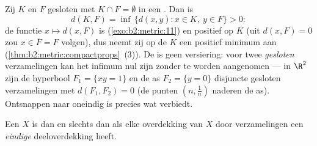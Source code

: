 \begin{example}\label{ex:b2:metric:setdistance}
Zij $K$  en $F$ gesloten met $K \cap F = \emptyset$ in een
. Dan is
\[
d(K, F) = \inf\,\{d(x, y) : x \in K,\ y \in F\} > 0 :
\]
de functie $x \mapsto d(x, F)$ is 
(\cref{exo:b2:metric:11}) en positief op $K$ (uit $d(x, F) = 0$
zou $x \in \overline F = F$ volgen), dus neemt zij op de 
$K$ een positief minimum aan
(\cref{thm:b2:metric:compactprops}~(3)). De  is geen
versiering: voor twee \emph{gesloten} verzamelingen kan het
infimum nul zijn zonder te worden aangenomen --- in $\R^2$ zijn de
hyperbool $F_1 = \{xy = 1\}$ en de as $F_2 = \{y = 0\}$ disjuncte
gesloten verzamelingen met $d(F_1, F_2) = 0$ (de punten $(n,
\frac1n)$ naderen de as). Ontsnappen naar oneindig is precies wat
 verbiedt.
\end{example}

\begin{theorem}\label{thm:b2:metric:borellebesgue}
Een  $X$ is  dan en slechts dan als elke
overdekking van $X$ door  verzamelingen een \emph{eindige}
deeloverdekking heeft.
\end{theorem}

